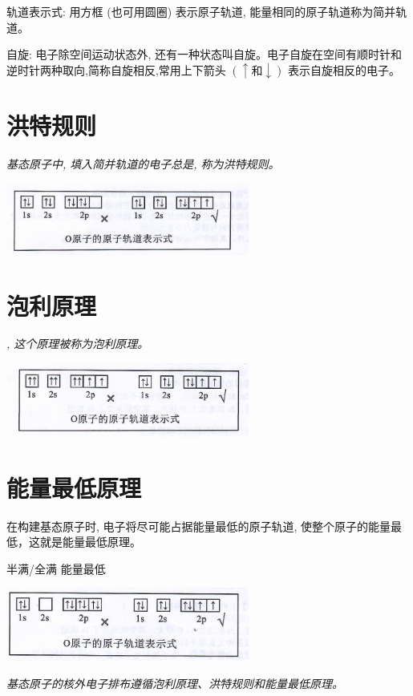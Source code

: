 \documentclass[10pt,cn]{elegantbook}
\begin{document}
	 轨道表示式: 用方框 (也可用圆圈) 表示原子轨道, 能量相同的原子轨道称为简并轨道。
	 
	 自旋: 电子除空间运动状态外, 还有一种状态叫自旋。电子自旋在空间有顺时针和逆时针两种取向,简称自旋相反,常用上下箭头 \(\left( { \uparrow \text{和} \downarrow }\right)\) 表示自旋相反的电子。
	 
	 \section{ 洪特规则}
	 \textit{ 基态原子中, 填入简并轨道的电子总是, 称为洪特规则。}
	  
	  	 \begin{center}
	  	\includegraphics[max width=0.6\textwidth]{image/c54-1.jpg}
	  \end{center}
	  
	 \section{泡利原理}
	 
	 \textit{, 这个原理被称为泡利原理。}
	
	 	 \begin{center}
	 	\includegraphics[max width=0.6\textwidth]{image/c54-2.jpg}
	 \end{center}

	 
	 \section{能量最低原理}
	 
	  在构建基态原子时, 电子将尽可能占据能量最低的原子轨道, 使整个原子的能量最低，这就是能量最低原理。 
	  
	  半满/全满 能量最低
	 
	 \begin{center}
	 	\includegraphics[max width=0.6\textwidth]{image/c54-3.jpg}
	 \end{center}
	 
	 \textit{基态原子的核外电子排布遵循泡利原理、洪特规则和能量最低原理。}
	 
	 
	 
\end{document}
